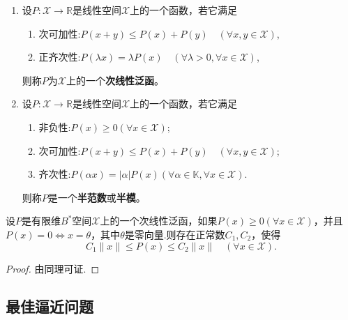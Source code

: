 \documentclass[../../main.tex]{subfiles}%
\begin{document}
\begin{definition}
\begin{enumerate}
\item 设$P: \mathscr{X} \to \mathbb{R}$是线性空间$\mathscr{X}$上的一个函数，若它满足
\begin{enumerate}[(1)]
\item 次可加性:$P(x+y) \leqslant P(x)+P(y) \quad (\forall x,y \in \mathscr{X})$,
\item 正齐次性:$P(\lambda x) = \lambda P(x) \quad (\forall \lambda>0, \forall x \in \mathscr{X})$,
\end{enumerate}
则称$P$为$\mathscr{X}$上的一个\textbf{次线性泛函}。

\item 设$P: \mathscr{X} \to \mathbb{R}$是线性空间$\mathscr{X}$上的一个函数，若它满足
\begin{enumerate}[(1)]
\item 非负性:$P(x) \geqslant 0 (\forall x \in \mathscr{X})$;

\item 次可加性:$P(x+y) \leqslant P(x)+P(y) \quad (\forall x,y \in \mathscr{X})$;

\item 齐次性:$P(\alpha x)=|\alpha| P(x) (\forall \alpha \in \mathbb{K}, \forall x \in \mathscr{X})$.
\end{enumerate}
则称$P$是一个\textbf{半范数}或\textbf{半模}。
\end{enumerate}
\end{definition}

\begin{theorem}\label{theorem:泛函分析--定理1.4.22}
设$P$是有限维$B^*$空间$\mathscr{X}$上的一个次线性泛函，如果$P(x) \geqslant 0 (\forall x \in \mathscr{X})$，并且$P(x)=0 \iff x=\theta$，其中$\theta$是零向量.则存在正常数$C_1,C_2$，使得
$$C_1\|x\| \leqslant P(x) \leqslant C_2\|x\| \quad (\forall x \in \mathscr{X}).$$
\end{theorem}
\begin{proof}
由同理可证.
\end{proof}


\subsection{最佳逼近问题}
\end{document}
